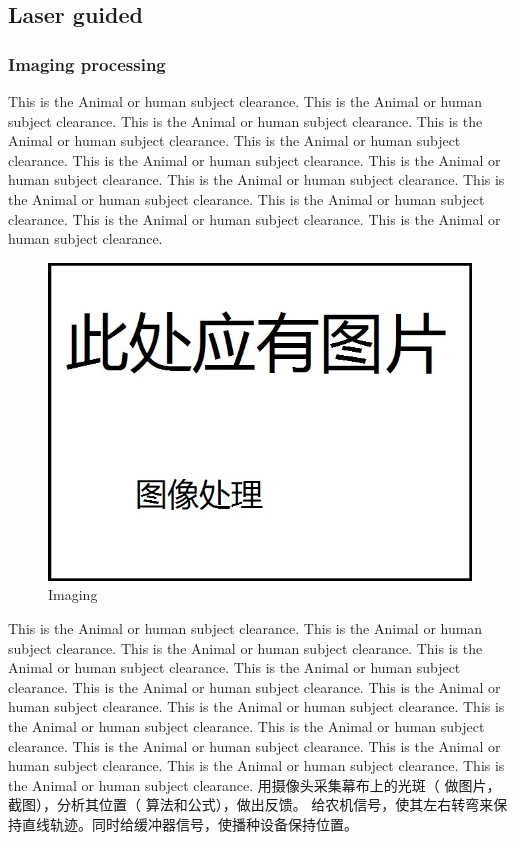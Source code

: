 \documentclass[12pt]{article}
\begin{document}
\begin{flushleft}
\subsection{Laser guided}

\subsubsection{Imaging processing}
This is the Animal or human subject clearance. This is the Animal or human subject clearance. This is the Animal or human subject clearance. This is the Animal or human subject clearance. This is the Animal or human subject clearance. This is the Animal or human subject clearance. This is the Animal or human subject clearance. This is the Animal or human subject clearance. This is the Animal or human subject clearance. This is the Animal or human subject clearance. This is the Animal or human subject clearance. This is the Animal or human subject clearance. 
\begin{figure}[h!]
	\begin{center}
		\includegraphics[scale = 0.6]{imaging.jpg}
		\caption{Imaging}
	\end{center}
\end{figure}
This is the Animal or human subject clearance. This is the Animal or human subject clearance. This is the Animal or human subject clearance. This is the Animal or human subject clearance. This is the Animal or human subject clearance. This is the Animal or human subject clearance. This is the Animal or human subject clearance. This is the Animal or human subject clearance. This is the Animal or human subject clearance. This is the Animal or human subject clearance. This is the Animal or human subject clearance. This is the Animal or human subject clearance. This is the Animal or human subject clearance. This is the Animal or human subject clearance. 
用摄像头采集幕布上的光斑（ 做图片，截图），分析其位置（ 算法和公式），做出反馈。 给农机信号，使其左右转弯来保持直线轨迹。同时给缓冲器信号，使播种设备保持位置。


\end{flushleft}
\end{document}
